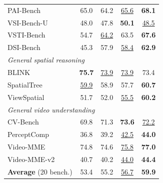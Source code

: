 \begin{table}[t]
{\begin{tabular}[t]{l cccc}
  \quad PAI-Bench~\citep{zhou2025paibench}      & 65.0 & 64.2 & \cellcolor{secondcell}\underline{65.6} & \cellcolor{bestcell}\textbf{68.1} \\
  \quad VSI-Bench-U~\citep{brown2025shortcuts}  & 48.0 & 47.8 & \cellcolor{bestcell}\textbf{50.1} & \cellcolor{secondcell}\underline{48.5} \\
  \quad VSTI-Bench~\citep{fan2025vlm}           & 54.7 & \cellcolor{secondcell}\underline{64.2} & 63.5 & \cellcolor{bestcell}\textbf{67.6} \\
  \quad DSI-Bench~\citep{zhang2025dsibench}     & 45.3 & 57.9 & \cellcolor{secondcell}\underline{58.4} & \cellcolor{bestcell}\textbf{62.9} \\
  \midrule
  \multicolumn{5}{l}{\textit{General spatial reasoning}} \\
  \quad BLINK~\citep{fu2024blink}               & \cellcolor{bestcell}\textbf{75.7} & \cellcolor{secondcell}\underline{73.9} & \cellcolor{secondcell}\underline{73.9} & 73.4 \\
  \quad SpatialTree~\citep{xiao2025spatialtree} & \cellcolor{secondcell}\underline{59.9} & 58.9 & 57.7 & \cellcolor{bestcell}\textbf{60.7} \\
  \quad ViewSpatial~\citep{li2025viewspatial}   & 51.7 & 52.0 & \cellcolor{secondcell}\underline{55.5} & \cellcolor{bestcell}\textbf{60.2} \\
  \midrule
  \multicolumn{5}{l}{\textit{General video understanding}} \\
  \quad CV-Bench~\citep{zhu2025cvbench}          & 69.8 & 71.3 & \cellcolor{bestcell}\textbf{73.6} & \cellcolor{secondcell}\underline{72.2} \\
  \quad PerceptComp~\citep{li2026perceptioncomp}& 36.8 & 39.2 & \cellcolor{secondcell}\underline{42.5} & \cellcolor{bestcell}\textbf{44.0} \\
  \quad Video-MME~\citep{fu2025video}           & 74.8 & 74.6 & \cellcolor{secondcell}\underline{75.8} & \cellcolor{bestcell}\textbf{77.0} \\
  \quad Video-MME-v2~\citep{videommev2_2026}    & 40.7 & 40.2 & \cellcolor{secondcell}\underline{44.0} & \cellcolor{bestcell}\textbf{44.4} \\
  \midrule
  \textbf{Average} (20 bench.) & 53.4 & 55.2 & \cellcolor{secondcell}\underline{56.7} & \cellcolor{bestcell}\textbf{59.9} \\
  \bottomrule
  \end{tabular}%
}
\sbox{\actionRBox}{%
  \setlength{\tabcolsep}{2pt}\renewcommand{\arraystretch}{1.05}\scriptsize
}
\end{table}
